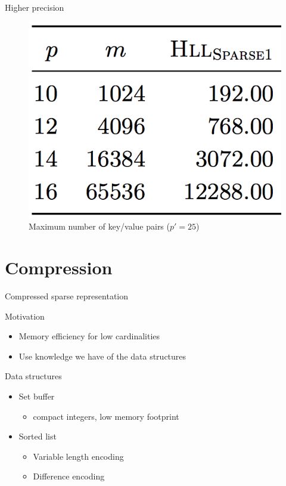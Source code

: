 \documentclass{beamer}
\begin{document}
\begin{frame}{Higher precision}

  \begin{figure}[c]
    \includegraphics [scale=0.45]  {sparse1.png}
    \caption{Maximum number of key/value pairs ($p' = 25$)}
  \end{figure}

\end{frame}



\section{Compression}
\begin{frame}{Compressed sparse representation}


  \begin{block}{Motivation}
    \begin{itemize}
      \item Memory efficiency for low cardinalities
      \item Use knowledge we have of the data structures
    \end{itemize}
  \end{block}


  \begin{block}{Data structures}
    \begin{itemize}
      \item Set buffer
        \begin{itemize}
        \item compact integers, low memory footprint
        \end{itemize}
      \item Sorted list
      \begin{itemize}
        \item Variable length encoding
        \item Difference encoding
      \end{itemize}
    \end{itemize}
  \end{block}


\end{frame}
\end{document}
